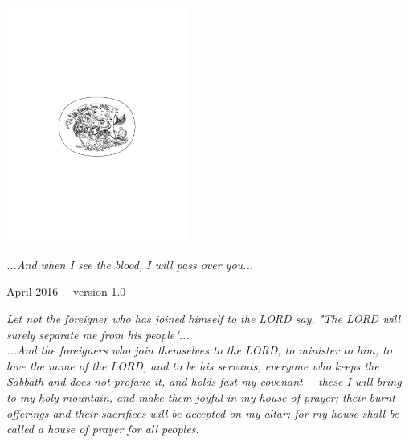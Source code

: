 \documentclass[10pt,oneside,footinclude=true,headinclude=true]{scrbook} %
\newcommand\pagequot[1]{
	\newpage
	\clearscrheadfoot
	\vspace*{\stretch{2}}
	\begin{center}
	\begin{minipage}[c]{8cm}
		#1
	\end{minipage}
	\end{center}
	\vspace*{\stretch{3}}
}
\begin{document}
\begin{titlepage}
\begin{center}
\large \hfill \vfill

\begingroup
\color{RoyalPurple} \\ \bigskip %
\endgroup

\vfill
\includegraphics[width=6cm]{TFZsuperellipse_bw} \\ \medskip %

\textit{...And when I see the blood, I will pass over you...} \\ \medskip %

April 2016\ -- version 1.0 %

\vfill
\end{center}
\end{titlepage}
    
\newpage
\clearscrheadfoot
\null

\tableofcontents 
\cleardoublepage %


\pagequot{
\centering
\textit{
Let not the foreigner who has joined himself to the LORD
say, "The LORD will surely separate me from his people"...\\
\smallskip
...And the foreigners who join themselves to the LORD,
    to minister to him, to love the name of the LORD,
    and to be his servants,
everyone who keeps the Sabbath and does not profane it,
    and holds fast my covenant—
these I will bring to my holy mountain,
    and make them joyful in my house of prayer;
their burnt offerings and their sacrifices
    will be accepted on my altar;
for my house shall be called a house of prayer
    for all peoples.\\
}
\bigskip
\spacedlowsmallcaps{Isaiah 56:3, 6-7}
}
\end{document}
